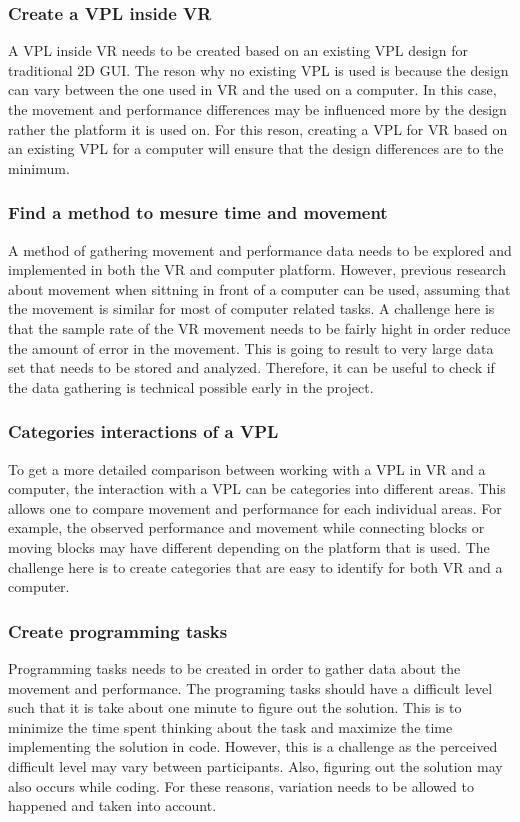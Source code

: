 \documentclass{sigchi}
\begin{document}
\subsubsection{Create a VPL inside VR}
A VPL inside VR needs to be created based on an existing VPL design for traditional 2D GUI. The reson why no existing VPL is used is because the design can vary between the one used in VR and the used on a computer. In this case, the movement and performance differences may be influenced more by the design rather the platform it is used on. For this reson, creating a VPL for VR based on an existing VPL for a computer will ensure that the design differences are to the minimum.

\subsubsection{Find a method to mesure time and movement}
A method of gathering movement and performance data needs to be explored and implemented in both the VR and computer platform. However, previous research about movement when sittning in front of a computer can be used, assuming that the movement is similar for most of computer related tasks. A challenge here is that the sample rate of the VR movement needs to be fairly hight in order reduce the amount of error in the movement. This is going to result to very large data set that needs to be stored and analyzed. Therefore, it can be useful to check if the data gathering is technical possible early in the project. 

\subsubsection{Categories interactions of a VPL}
To get a more detailed comparison between working with a VPL in VR and a computer, the interaction with a VPL can be categories into different areas. This allows one to compare movement and performance for each individual areas. For example, the observed performance and movement while connecting blocks or moving blocks may have different depending on the platform that is used. The challenge here is to create categories that are easy to identify for both VR and a computer.

\subsubsection{Create programming tasks}
Programming tasks needs to be created in order to gather data about the movement and performance. The programing tasks should have a difficult level such that it is take about one minute to figure out the solution. This is to minimize the time spent thinking about the task and maximize the time implementing the solution in code. However, this is a challenge as the perceived difficult level may vary between participants. Also, figuring out the solution may also occurs while coding. For these reasons, variation needs to be allowed to happened and taken into account.
\end{document}
